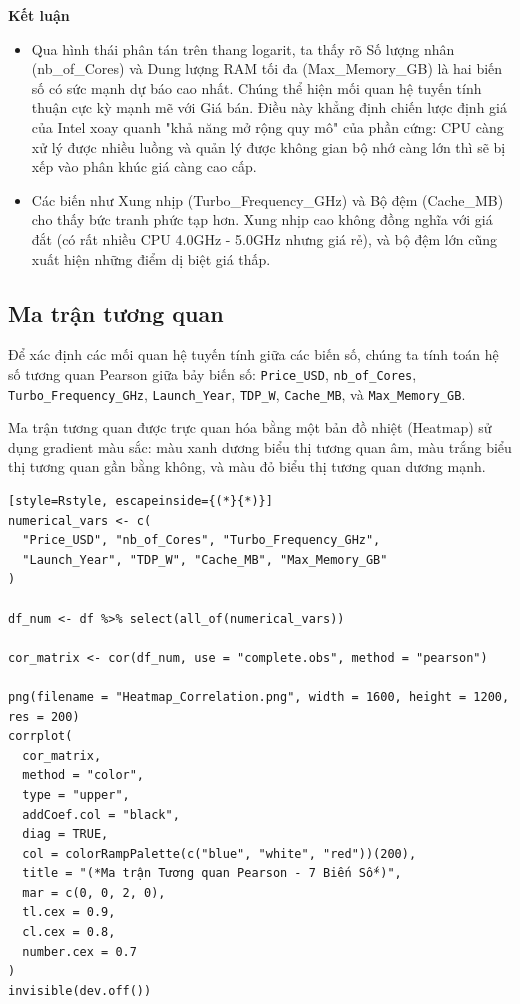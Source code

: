 \documentclass[12pt, a4paper]{article}
\begin{document}
\textbf{Kết luận}
\begin{itemize}
    \item Qua hình thái phân tán trên thang logarit, ta thấy rõ Số lượng nhân (nb\_of\_Cores) và Dung lượng RAM tối đa (Max\_Memory\_GB) là hai biến số có sức mạnh dự báo cao nhất. Chúng thể hiện mối quan hệ tuyến tính thuận cực kỳ mạnh mẽ với Giá bán. Điều này khẳng định chiến lược định giá của Intel xoay quanh "khả năng mở rộng quy mô" của phần cứng: CPU càng xử lý được nhiều luồng và quản lý được không gian bộ nhớ càng lớn thì sẽ bị xếp vào phân khúc giá càng cao cấp.
    \item Các biến như Xung nhịp (Turbo\_Frequency\_GHz) và Bộ đệm (Cache\_MB) cho thấy bức tranh phức tạp hơn. Xung nhịp cao không đồng nghĩa với giá đắt (có rất nhiều CPU 4.0GHz - 5.0GHz nhưng giá rẻ), và bộ đệm lớn cũng xuất hiện những điểm dị biệt giá thấp.
\end{itemize}

\subsection{Ma trận tương quan}

Để xác định các mối quan hệ tuyến tính giữa các biến số, chúng ta tính toán hệ số tương quan Pearson giữa bảy biến số: \texttt{Price\_USD}, \texttt{nb\_of\_Cores}, \texttt{Turbo\_Frequency\_GHz}, \texttt{Launch\_Year}, \texttt{TDP\_W}, \texttt{Cache\_MB}, và \texttt{Max\_Memory\_GB}. 

Ma trận tương quan được trực quan hóa bằng một bản đồ nhiệt (Heatmap) sử dụng gradient màu sắc: màu xanh dương biểu thị tương quan âm, màu trắng biểu thị tương quan gần bằng không, và màu đỏ biểu thị tương quan dương mạnh.

\begin{lstlisting}[style=Rstyle, escapeinside={(*}{*)}]
numerical_vars <- c(
  "Price_USD", "nb_of_Cores", "Turbo_Frequency_GHz",
  "Launch_Year", "TDP_W", "Cache_MB", "Max_Memory_GB"
)

df_num <- df %>% select(all_of(numerical_vars))

cor_matrix <- cor(df_num, use = "complete.obs", method = "pearson")

png(filename = "Heatmap_Correlation.png", width = 1600, height = 1200, res = 200)
corrplot(
  cor_matrix,
  method = "color",
  type = "upper",
  addCoef.col = "black",
  diag = TRUE,
  col = colorRampPalette(c("blue", "white", "red"))(200),
  title = "(*Ma trận Tương quan Pearson - 7 Biến Số*)",
  mar = c(0, 0, 2, 0),
  tl.cex = 0.9,
  cl.cex = 0.8,
  number.cex = 0.7
)
invisible(dev.off())
\end{lstlisting}
\end{document}
